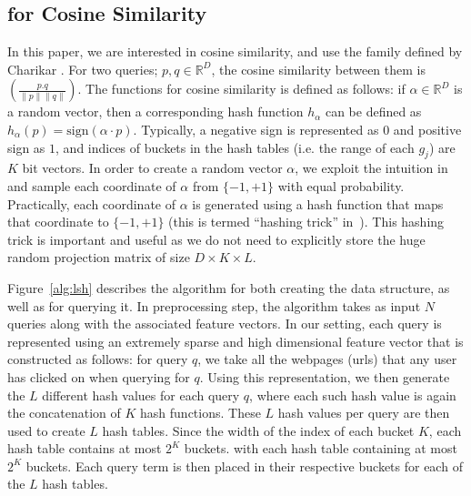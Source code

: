 \subsection{\lsh for Cosine Similarity}
\label{subsec:vlsh:cosine}
In this paper, we are interested in cosine similarity, and use the \lsh family defined by Charikar . 
For two queries; $p,q \in \mathbb{R}^D$, the cosine similarity between them is $\left( \frac{p.q}{ \| p \| \| q \| }\right)$. 
The \lsh functions for cosine similarity is defined as follows: if $\alpha \in \mathbb{R}^D$ is a random vector, 
then a corresponding hash function $h_{\alpha}$ can be defined as $h_{\alpha}(p) = \mathrm{sign}(\alpha \cdot p)$.
Typically, a negative sign is represented as $0$ and positive sign as $1$, and indices of buckets in the hash tables (i.e. the
range of each $g_j$) are $K$ bit vectors. 
In order to create a random vector $\alpha$, we exploit the intuition in
\cite{Achlioptas03,LiH06} and sample each coordinate of $\alpha$ from $\{-1, +1\}$ with equal probability.
Practically, each coordinate of $\alpha$ is generated using a hash function that maps that coordinate
to $\{-1, +1\}$ (this is termed ``hashing trick'' in~\cite{weinberger09hashing}). 
This hashing trick is important and useful as we do not need to explicitly store the 
huge random projection matrix of size $D \times K \times L$.  

%
Figure~\ref{alg:lsh} describes the algorithm for both creating the data structure, as well as for
querying it. In preprocessing step, the algorithm takes as input $N$ queries along with the associated feature vectors. 
In our setting, each query is represented using an extremely sparse and high dimensional feature vector
that is constructed as follows: for query $q$, we take all the webpages (urls) that any user has clicked on 
when querying for $q$. Using this representation, we then generate the 
$L$ different hash values for each query $q$, where each such hash value is again 
the concatenation of $K$ hash functions. These $L$ hash values per query are then used to create $L$ hash tables.
Since the width of the index of each bucket $K$, each hash table contains at most $2^K$ buckets. 
with each hash table containing at most $2^K$ buckets.
Each query term is then placed in their respective buckets for each of the $L$ hash tables.

